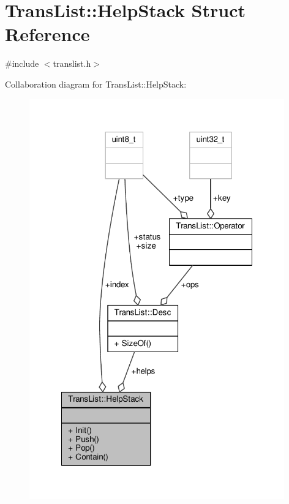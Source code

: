 \hypertarget{structTransList_1_1HelpStack}{\section{Trans\-List\-:\-:Help\-Stack Struct Reference}
\label{structTransList_1_1HelpStack}
}


{\ttfamily \#include $<$translist.\-h$>$}



Collaboration diagram for Trans\-List\-:\-:Help\-Stack\-:
\nopagebreak
\begin{figure}[H]
\begin{center}
\leavevmode
\includegraphics[width=312pt]{structTransList_1_1HelpStack__coll__graph}
\end{center}
\end{figure}

